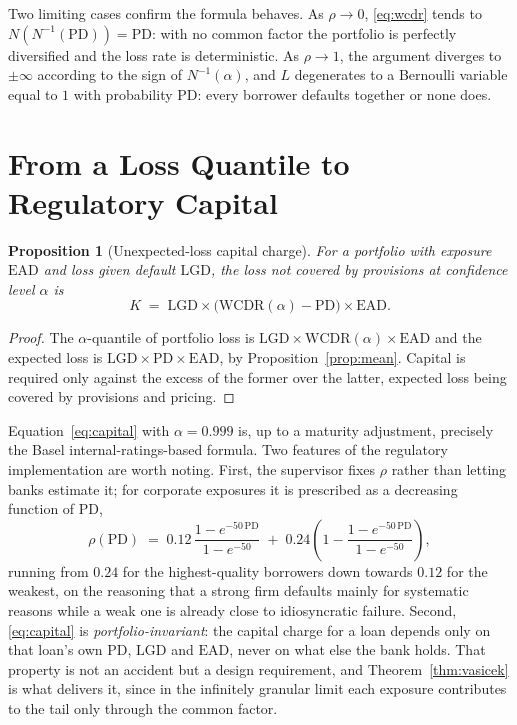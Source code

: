 \documentclass[11pt]{article}
\newtheorem{proposition}{Proposition}
\theoremstyle{remark}
\theoremstyle{definition}
\begin{document}
Two limiting cases confirm the formula behaves. As $\rho \to 0$, \eqref{eq:wcdr} tends to $N(N^{-1}(\text{PD})) = \text{PD}$: with no common factor the portfolio is perfectly diversified and the loss rate is deterministic. As $\rho \to 1$, the argument diverges to $\pm\infty$ according to the sign of $N^{-1}(\alpha)$, and $L$ degenerates to a Bernoulli variable equal to $1$ with probability $\text{PD}$: every borrower defaults together or none does.

\section{From a Loss Quantile to Regulatory Capital}
\label{sec:basel}

\begin{proposition}[Unexpected-loss capital charge]
\label{prop:capital}
For a portfolio with exposure $\text{EAD}$ and loss given default $\text{LGD}$, the loss not covered by provisions at confidence level $\alpha$ is
\begin{equation}
\label{eq:capital}
K \;=\; \text{LGD} \times \big(\text{WCDR}(\alpha) - \text{PD}\big) \times \text{EAD}.
\end{equation}
\end{proposition}

\begin{proof}
The $\alpha$-quantile of portfolio loss is $\text{LGD}\times\text{WCDR}(\alpha)\times\text{EAD}$ and the expected loss is $\text{LGD}\times\text{PD}\times\text{EAD}$, by Proposition~\ref{prop:mean}. Capital is required only against the excess of the former over the latter, expected loss being covered by provisions and pricing.
\end{proof}

Equation~\eqref{eq:capital} with $\alpha = 0.999$ is, up to a maturity adjustment, precisely the Basel internal-ratings-based formula. Two features of the regulatory implementation are worth noting. First, the supervisor fixes $\rho$ rather than letting banks estimate it; for corporate exposures it is prescribed as a decreasing function of $\text{PD}$,
\begin{equation}
\label{eq:baselrho}
\rho(\text{PD}) \;=\; 0.12\,\frac{1-e^{-50\,\text{PD}}}{1-e^{-50}} \;+\; 0.24\left(1-\frac{1-e^{-50\,\text{PD}}}{1-e^{-50}}\right),
\end{equation}
running from $0.24$ for the highest-quality borrowers down towards $0.12$ for the weakest, on the reasoning that a strong firm defaults mainly for systematic reasons while a weak one is already close to idiosyncratic failure. Second, \eqref{eq:capital} is \emph{portfolio-invariant}: the capital charge for a loan depends only on that loan's own $\text{PD}$, $\text{LGD}$ and $\text{EAD}$, never on what else the bank holds. That property is not an accident but a design requirement, and Theorem~\ref{thm:vasicek} is what delivers it, since in the infinitely granular limit each exposure contributes to the tail only through the common factor.
\end{document}
